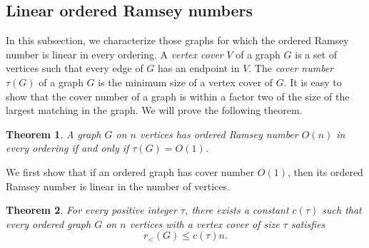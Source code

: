 \documentclass[11pt]{article}
\newtheorem{theorem}{Theorem}[section]
\begin{document}
\subsection{Linear ordered Ramsey numbers}

In this subsection, we characterize those graphs for which the ordered Ramsey number is linear in every ordering.
 A {\it vertex cover} $V$ of a graph $G$ is a set of vertices such that every edge of $G$ has an endpoint in $V$. The {\it cover number} $\tau(G)$ of a graph $G$ is the minimum size of a vertex cover of $G$. It is easy to show that the cover number of a graph is within a factor two of the size of the largest matching in the graph. We will prove the following theorem. 
 
 \begin{theorem}\label{charact}
 A graph $G$ on $n$ vertices has ordered Ramsey number $O(n)$ in every ordering if and only if $\tau(G)=O(1)$. 
 \end{theorem}

We first show that if an ordered graph has cover number $O(1)$, then its ordered Ramsey number is linear in the number of vertices. 

\begin{theorem}\label{coverfirst}
For every positive integer $\tau$, there exists a constant $c(\tau)$
such that every ordered graph $G$ on $n$ vertices
with a vertex cover of size $\tau$ satisfies
\[r_{<}(G) \leq c(\tau) n.\]
\end{theorem}
\end{document}
